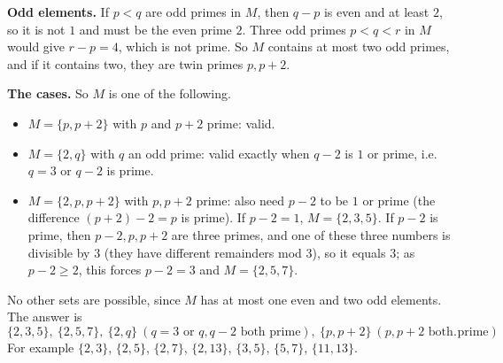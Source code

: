 \textbf{Odd elements.} If $p<q$ are odd primes in $M$, then $q-p$ is even and at least $2$, so it is not $1$ and must be the even prime $2$. Three odd primes $p<q<r$ in $M$ would give $r-p=4$, which is not prime. So $M$ contains at most two odd primes, and if it contains two, they are twin primes $p,p+2$.

\textbf{The cases.} So $M$ is one of the following.
\begin{itemize}
\item $M=\{p,p+2\}$ with $p$ and $p+2$ prime: valid.
\item $M=\{2,q\}$ with $q$ an odd prime: valid exactly when $q-2$ is $1$ or prime, i.e. $q=3$ or $q-2$ is prime.
\item $M=\{2,p,p+2\}$ with $p,p+2$ prime: also need $p-2$ to be $1$ or prime (the difference $(p+2)-2=p$ is prime). If $p-2=1$, $M=\{2,3,5\}$. If $p-2$ is prime, then $p-2,p,p+2$ are three primes, and one of these three numbers is divisible by $3$ (they have different remainders mod $3$), so it equals $3$; as $p-2\ge2$, this forces $p-2=3$ and $M=\{2,5,7\}$.
\end{itemize}
No other sets are possible, since $M$ has at most one even and two odd elements. The answer is
\[\boxed{\{2,3,5\},\ \{2,5,7\},\ \{2,q\}\ (q=3\text{ or }q,q-2\text{ both prime}),\ \{p,p+2\}\ (p,p+2\text{ both prime})}.\]
For example $\{2,3\}$, $\{2,5\}$, $\{2,7\}$, $\{2,13\}$, $\{3,5\}$, $\{5,7\}$, $\{11,13\}$.
